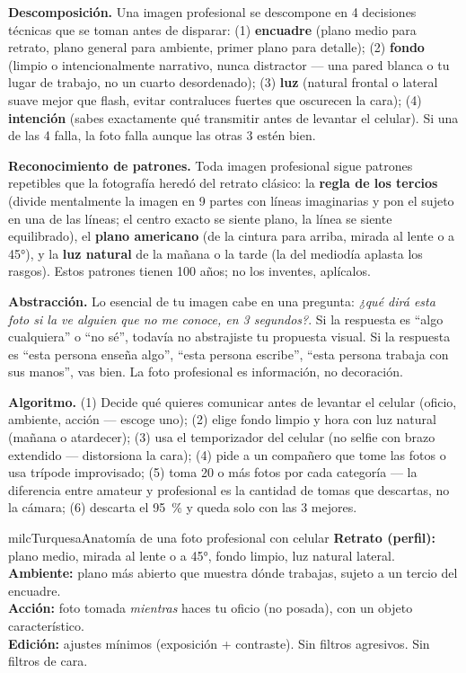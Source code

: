 \documentclass[11pt,letterpaper]{article}
\newcommand{\milcpaso}[3]{%
\Needspace{4\baselineskip}%
\begin{tcolorbox}[enhanced,colback=white,colframe=milcLinea,arc=1.5mm,boxrule=.9pt,
  left=14mm,right=4mm,top=3mm,bottom=3mm,before skip=4pt,after skip=4pt,
  fontupper=\RaggedRight,
  overlay={\node[anchor=north west,circle,fill=#2,text=white,inner sep=0pt,
    minimum size=7.4mm,font=\sffamily\bfseries\small]
    at ([xshift=3.6mm,yshift=-3.2mm]frame.north west) {#1};}]
#3
\end{tcolorbox}}
\begin{document}
\milcpaso{1}{milcTurquesa}{\textbf{Descomposición.} Una imagen profesional se descompone en 4 decisiones técnicas que se toman antes de disparar: (1) \textbf{encuadre} (plano medio para retrato, plano general para ambiente, primer plano para detalle); (2) \textbf{fondo} (limpio o intencionalmente narrativo, nunca distractor --- una pared blanca o tu lugar de trabajo, no un cuarto desordenado); (3) \textbf{luz} (natural frontal o lateral suave mejor que flash, evitar contraluces fuertes que oscurecen la cara); (4) \textbf{intención} (sabes exactamente qué transmitir antes de levantar el celular). Si una de las 4 falla, la foto falla aunque las otras 3 estén bien.}
\milcpaso{2}{milcTurquesa}{\textbf{Reconocimiento de patrones.} Toda imagen profesional sigue patrones repetibles que la fotografía heredó del retrato clásico: la \textbf{regla de los tercios} (divide mentalmente la imagen en 9 partes con líneas imaginarias y pon el sujeto en una de las líneas; el centro exacto se siente plano, la línea se siente equilibrado), el \textbf{plano americano} (de la cintura para arriba, mirada al lente o a 45°), y la \textbf{luz natural} de la mañana o la tarde (la del mediodía aplasta los rasgos). Estos patrones tienen 100 años; no los inventes, aplícalos.}
\milcpaso{3}{milcTurquesa}{\textbf{Abstracción.} Lo esencial de tu imagen cabe en una pregunta: \emph{¿qué dirá esta foto si la ve alguien que no me conoce, en 3 segundos?}. Si la respuesta es ``algo cualquiera'' o ``no sé'', todavía no abstrajiste tu propuesta visual. Si la respuesta es ``esta persona enseña algo'', ``esta persona escribe'', ``esta persona trabaja con sus manos'', vas bien. La foto profesional es información, no decoración.}
\milcpaso{4}{milcTurquesa}{\textbf{Algoritmo.} (1) Decide qué quieres comunicar antes de levantar el celular (oficio, ambiente, acción --- escoge uno); (2) elige fondo limpio y hora con luz natural (mañana o atardecer); (3) usa el temporizador del celular (no selfie con brazo extendido --- distorsiona la cara); (4) pide a un compañero que tome las fotos o usa trípode improvisado; (5) toma 20 o más fotos por cada categoría --- la diferencia entre amateur y profesional es la cantidad de tomas que descartas, no la cámara; (6) descarta el 95~\% y queda solo con las 3 mejores.}

\begin{drawbox}{milcTurquesa}{Anatomía de una foto profesional con celular}
\textbf{Retrato (perfil):} plano medio, mirada al lente o a 45°, fondo limpio, luz natural lateral. \\[1mm] \textbf{Ambiente:} plano más abierto que muestra dónde trabajas, sujeto a un tercio del encuadre. \\[1mm] \textbf{Acción:} foto tomada \emph{mientras} haces tu oficio (no posada), con un objeto característico. \\[1mm] \textbf{Edición:} ajustes mínimos (exposición + contraste). Sin filtros agresivos. Sin filtros de cara.
\end{drawbox}
\end{document}
